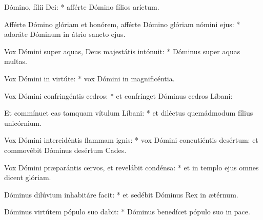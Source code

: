\begin{psalmus}

     Dómino, fílii Dei: * afférte Dómino fílios aríetum.

    Afférte Dómino glóriam et honórem, afférte Dómino glóriam nómini ejus: * adoráte Dóminum in átrio sancto ejus.

    Vox Dómini super aquas, Deus majestátis intónuit: * Dóminus super aquas multas.

    Vox Dómini in virtúte: * vox Dómini in magnificéntia.

    Vox Dómini confringéntis cedros: * et confrínget Dóminus cedros Líbani:

    Et commínuet eas tamquam vítulum Líbani: * et diléctus quemádmodum fílius unicórnium.

    Vox Dómini intercidéntis flammam ignis: * vox Dómini concutiéntis desértum: et commovébit Dóminus desértum Cades.

    Vox Dómini præparántis cervos, et revelábit condénsa: * et in templo ejus omnes dicent glóriam.

    Dóminus dilúvium inhabitáre facit: * et sedébit Dóminus Rex in ætérnum.

    Dóminus virtútem pópulo suo dabit: * Dóminus benedícet pópulo suo in pace.

\end{psalmus}
